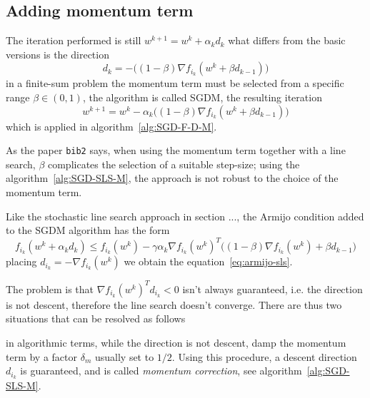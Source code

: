 \subsection{Adding momentum term}

The iteration performed is still $w^{k+1}=w^k+\alpha_kd_k$ what differs from the basic versions is the direction
\[
d_k=-\bigl((1-\beta)\nabla f_{i_k}(w^k+\beta d_{k-1})\bigr)
\]
in a finite-sum problem the momentum term must be selected from a specific range $\beta\in(0,1)$, the algorithm is called SGDM, the resulting iteration
\begin{equation}\label{eq:sgdm-step}
w^{k+1}=w^k-\alpha_k\bigl((1-\beta)\nabla f_{i_k}(w^k+\beta d_{k-1})\bigr)
\end{equation}
which is applied in algorithm~\vref{alg:SGD-F-D-M}.

As the paper \texttt{bib2} says, when using the momentum term together with a line search, $\beta$ complicates the selection of a suitable step-size; using the algorithm~\ref{alg:SGD-SLS-M}, the approach is not robust to the choice of the momentum term.

Like the stochastic line search approach in section ..., the Armijo condition added to the SGDM algorithm has the form
\begin{equation}\label{eq:armijo-sgdm}
f_{i_k}(w^k+\alpha_kd_k)\leq f_{i_k}(w^k)-\gamma\alpha_k\nabla f_{i_k}(w^k)^T\bigl((1-\beta)\nabla f_{i_k}(w^k)+\beta d_{k-1}\bigr)
\end{equation}
placing $d_{i_k}=-\nabla f_{i_k}(w^k)$ we obtain the equation~\eqref{eq:armijo-sls}.

The problem is that $\nabla f_{i_k}(w^k)^Td_{i_k}<0$ isn't always guaranteed, i.e. the direction is not descent, therefore the line search doesn't converge. There are thus two situations that can be resolved as follows
\begin{center}
\end{center}
in algorithmic terms, while the direction is not descent, damp the momentum term by a factor $\delta_m$ usually set to $1/2$. Using this procedure, a descent direction $d_{i_k}$ is guaranteed, and is called \emph{momentum correction}, see algorithm~\vref{alg:SGD-SLS-M}.

